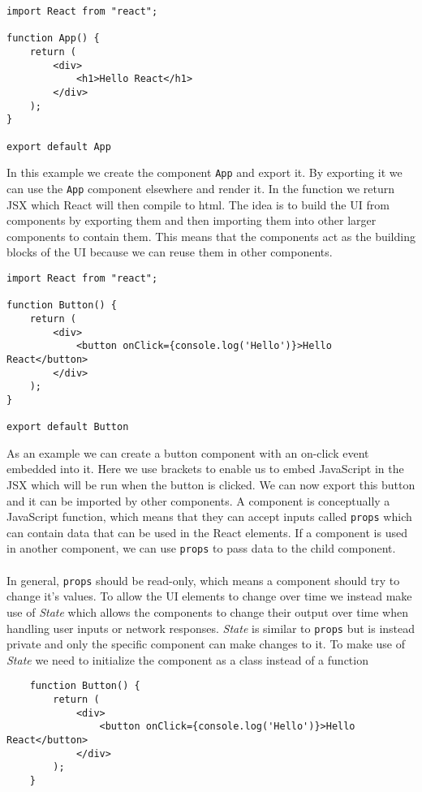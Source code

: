 \begin{lstlisting}
import React from "react";
    
function App() {
    return (
        <div>
            <h1>Hello React</h1>
        </div>
    );
}

export default App
\end{lstlisting}
In this example we create the component \texttt{App} and export it. 
By exporting it we can use the \texttt{App} component elsewhere and render it. 
In the function we return JSX which React will then compile to html.
The idea is to build the UI from components by exporting them and then importing them into other larger components to contain them.
This means that the components act as the building blocks of the UI because we can reuse them in other components.
\begin{lstlisting}
import React from "react";
        
function Button() {
    return (
        <div>
            <button onClick={console.log('Hello')}>Hello React</button>
        </div>
    );
}
    
export default Button
\end{lstlisting}
As an example we can create a button component with an on-click event embedded into it. 
Here we use brackets to enable us to embed JavaScript in the JSX which will be run when the button is clicked.
We can now export this button and it can be imported by other components. 
A component is conceptually a JavaScript function, which means that they can accept inputs called \texttt{props} which can contain data that can be used in the React elements. 
If a component is used in another component, we can use \texttt{props} to pass data to the child component.
\\\\
In general, \texttt{props} should be read-only, which means a component should try to change it's values. 
To allow the UI elements to change over time we instead make use of \textit{State} which allows the components to change their output over time when handling user inputs or network responses. 
\textit{State}  is similar to \texttt{props} but is instead private and only the specific component can make changes to it. To make use of \textit{State} we need to initialize the component as a class instead of a function
\begin{lstlisting}
    function Button() {
        return (
            <div>
                <button onClick={console.log('Hello')}>Hello React</button>
            </div>
        );
    }
\end{lstlisting}
